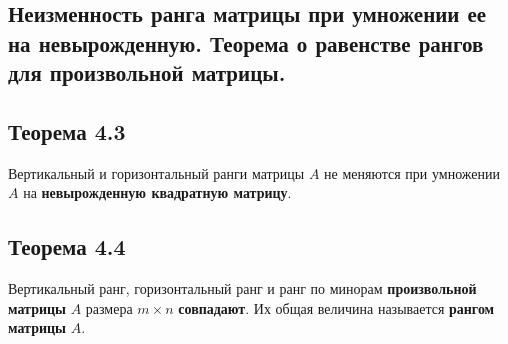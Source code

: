 {
\subsection{Неизменность ранга матрицы при умножении ее на невырожденную. Теорема о равенстве рангов для произвольной матрицы.}

\subsection*{Теорема 4.3}

Вертикальный и горизонтальный ранги матрицы \( A \) не меняются при умножении \( A \) на \textbf{невырожденную квадратную матрицу}.


\subsection*{Теорема 4.4}

Вертикальный ранг, горизонтальный ранг и ранг по минорам \textbf{произвольной матрицы} \( A \) размера \( m \times n \) \textbf{совпадают}. Их общая величина называется \textbf{рангом матрицы} \( A \).


}